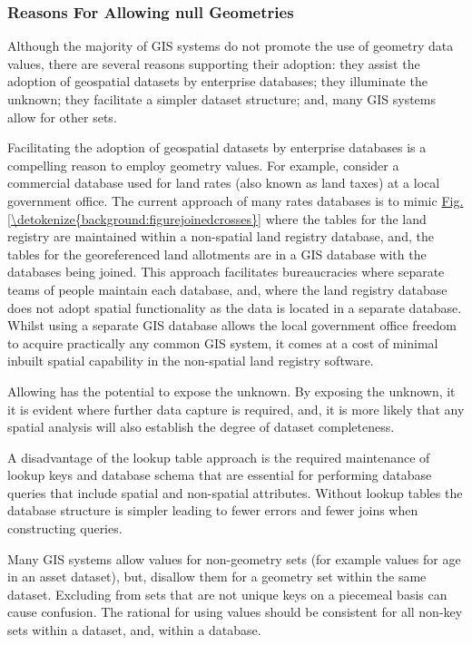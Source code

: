 \documentclass[a4paper,11pt,english]{sphinxmanual}
\begin{document}
\subsubsection{Reasons For Allowing null Geometries}
\label{\detokenize{background:reasons-for-allowing-null-geometries}}
Although the majority of GIS systems do not promote the use of  geometry data values, there are several reasons supporting their adoption: they assist the adoption of geospatial datasets by enterprise databases; they illuminate the unknown; they facilitate a simpler dataset structure; and, many GIS systems allow  for other sets.

Facilitating the adoption of geospatial datasets by enterprise databases is a compelling reason to employ  geometry values.  For example, consider a commercial database used for land rates (also known as land taxes)  at a local government office.  The current approach of many rates databases is to mimic \hyperref[\detokenize{background:figurejoinedcrosses}]{Fig.\@ \ref{\detokenize{background:figurejoinedcrosses}}} where the tables for the land registry are maintained within a non-spatial land registry database, and, the tables for the georeferenced land allotments are in a GIS database with the databases being joined.  This approach facilitates bureaucracies where separate teams of people maintain each database, and, where the land registry database does not adopt spatial functionality as the data is located in a separate database.  Whilst using a separate GIS database allows the local government office freedom to acquire practically any common GIS system, it comes at a cost of minimal inbuilt spatial capability in the non-spatial land registry software.

Allowing  has the potential to expose the unknown.  By exposing the unknown, it it is evident where further data capture is required, and, it is more likely that any spatial analysis will also establish the degree of dataset completeness.

A disadvantage of the lookup table approach is the required maintenance of lookup keys and database schema that are essential for performing database queries that include spatial and non-spatial attributes.  Without lookup tables the database structure is simpler leading to fewer errors and fewer joins when constructing queries.

Many GIS systems allow  values for non-geometry sets (for example  values for age in an asset dataset), but, disallow them for a geometry set within the same dataset.  Excluding  from sets that are not unique keys on a piecemeal basis can cause confusion.  The rational for using  values should be consistent for all non-key sets within a dataset, and, within a database.
\end{document}
